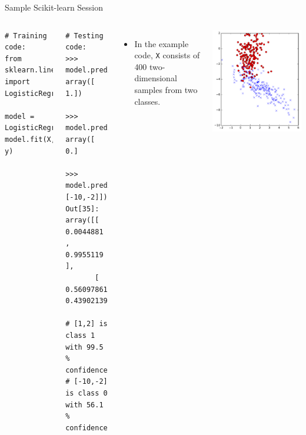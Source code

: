 \documentclass[10pt, aspectratio=169]{beamer} %
\begin{document}
\begin{frame}[fragile,allowframebreaks=0.8]
 {Sample Scikit-learn Session}
\begin{columns}[onlytextwidth]
\begin{lstlisting}
# Training code:
from sklearn.linear_model import LogisticRegression

model = LogisticRegression()
model.fit(X, y)
\end{lstlisting}
\begin{lstlisting}
# Testing code:
>>> model.predict([1,2])
array([ 1.])

>>> model.predict([-10,-2])
array([ 0.]

>>> model.predict_proba([[1,2], [-10,-2]])
Out[35]: 
array([[ 0.0044881 ,  0.9955119 ],
       [ 0.56097861,  0.43902139]])
			
# [1,2] is class 1 with 99.5 % confidence.
# [-10,-2] is class 0 with 56.1 % confidence.
\end{lstlisting}
\begin{itemize}
\item In the example code, \verb+X+ consists of 400 two-dimensional samples from two classes.
\end{itemize}
\centerline{\includegraphics[width=0.7\columnwidth]{twoClassExample_plain.pdf}}
\end{columns}
\end{frame}
\end{document}
